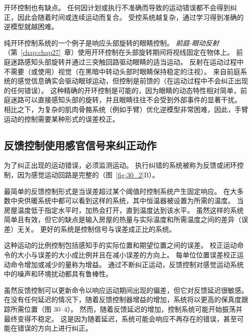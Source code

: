 开环控制也有缺点。
任何因计划或执行不准确而导致的运动错误都不会得到纠正，因此会随着时间或连续运动而复合。
受控系统越复杂，通过学习得到准确的逆模型就越困难。


纯开环控制系统的一个例子是响应头部旋转的眼睛控制。
\textit{前庭-眼动反射}（第~\ref{chap:chap27}~章）使用开环控制在头部旋转期间将视线固定在物体上。
前庭迷路感知头部旋转并通过三突触回路驱动眼睛的适当运动。
反射在运动过程中不需要（或使用）视觉（在黑暗中转动头部时眼睛保持稳定的注视）。
来自前庭系统的感觉信息确实会驱动眼球运动，但控制是前馈的（在运动过程中不会纠正出现的任何错误）。
这种精确的开环控制是可能的，因为眼睛的动态特性相对简单，前庭迷路可以直接感知头部的旋转，并且眼睛往往不会受到外部事件的显著干扰。
相比之下，为复杂的肌肉骨骼系统（例如手臂）优化逆模型非常困难，因此，手臂运动的控制需要某种形式的误差校正。



\subsection{反馈控制使用感官信号来纠正动作}

为了纠正出现的运动错误，必须监测运动。
执行纠错的系统被称为反馈或闭环控制，因为感觉运动回路是完整的（图~\ref{fig:30_2}B）。


最简单的反馈控制形式是当误差超过某个阈值时控制系统产生固定响应。
在大多数中央供暖系统中都可以看到这样的系统，其中恒温器被设置为所需的温度。
当房屋温度低于指定水平时，加热会打开，直到温度达到该水平。
虽然这样的系统简单且有效，但它的缺点是输入房屋的热量与实际温度和所需温度之间的差异（误差）无关。
更好的系统是控制信号与误差成正比的系统。


这种运动的比例控制包括感知手的实际位置和期望位置之间的误差。
校正运动命令的大小与误差的大小成比例并且在减小误差的方向上。
每单位位置误差校正运动命令增加或减少的量称为增益。
通过不断纠正运动，反馈控制对感觉运动系统中的噪声和环境扰动都具有鲁棒性。


虽然反馈控制可以更新命令以响应运动期间出现的偏差，但它对反馈延迟很敏感。
在没有任何延迟的情况下，随着反馈控制器增益的增加，系统将以更高的保真度跟踪所需位置（图 30–4）。
然而，随着反馈延迟的增加，控制系统可能开始振荡并最终变得不稳定。
这是因为随着延迟，系统可能会响应不再存在的错误，甚至可能在错误的方向上进行纠正。


